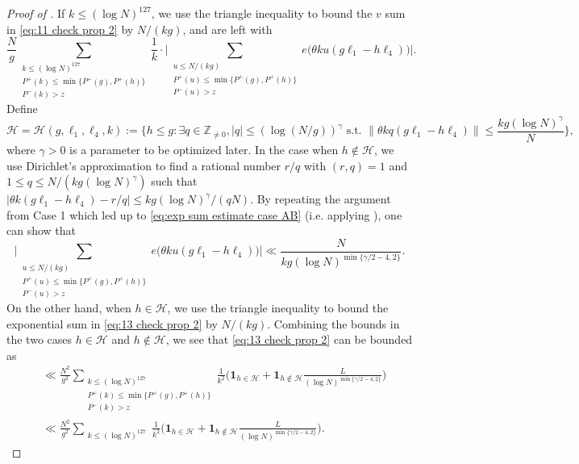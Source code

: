 \documentclass[12pt]{amsart}
\renewcommand{\leq}{\leqslant}
\numberwithin{equation}{section}
\theoremstyle{plain}
\theoremstyle{definition}
\renewcommand{\l}{\ell}
\newcommand{\Z}{\mathbb{Z}}
\newcommand{\CH}{\mathcal{H}}
\begin{document}
\begin{proof}[Proof of ]
		If $k \leq (\log N)^{127}$, we use the triangle inequality to bound the $v$ sum in \eqref{eq:11 check prop 2} by $N/(kg)$, and are left with
		\begin{equation}\label{eq:13 check prop 2}
			\frac{N}{g}\sum_{\substack{k \leq (\log N)^{127} \\ P^+(k) \leq \min\{P^+(g),P^+(h)\} \\ P^-(k) > z}} \frac{1}{k} \cdot \bigg|\sum_{\substack{u \leq N/(kg) \\ P^+(u) \leq \min\{P^+(g),P^+(h)\} \\ P^-(u) > z}}e\big(\theta k u(g \l_1 - h\l_4)\big)\bigg|.
		\end{equation}
		Define $$\CH = \CH(g,\l_1,\l_4,k) := \bigg\{h \leq g : \exists q \in \Z_{\ne 0}, |q| \leq (\log (N/g))^{\gamma} \text{ s.t. } \|\theta k q (g \l_1 - h\l_4)\| \leq \frac{kg(\log N)^{\gamma}}{N}\bigg\},$$
		where $\gamma > 0$ is a parameter to be optimized later. In the case when $h \not \in \CH$, we use Dirichlet's approximation to find a rational number $r/q$ with $(r,q) = 1$ and $1 \leq q \leq N/(kg(\log N)^\gamma)$ such that $|\theta k (g \l_1 - h\l_4)-r/q| \leq kg(\log N)^\gamma/(qN)$. By repeating the argument from Case 1 which led up to \eqref{eq:exp sum estimate case AB} (i.e. applying ), one can show that
		\begin{equation}\label{eq:13.5 check prop 2}
			\bigg|\sum_{\substack{u \leq N/(kg) \\ P^+(u) \leq \min\{P^+(g),P^+(h)\} \\ P^-(u) > z}}e\big(\theta k u(g \l_1 - h\l_4)\big)\bigg| \ll \frac{N}{kg (\log N)^{\min\{\gamma/2-4,2\}}}.
		\end{equation}
		On the other hand, when $h \in \CH$, we use the triangle inequality to bound the exponential sum in \eqref{eq:13 check prop 2} by $N/(kg)$. Combining the bounds in the two cases $h \in \CH$ and $h \not \in \CH$, we see that \eqref{eq:13 check prop 2} can be bounded as
		\begin{align*}
			&\ll \frac{N^2}{g^2} \sum_{\substack{k \leq (\log N)^{127} \\ P^+(k) \leq \min\{P^+(g),P^+(h)\} \\ P^-(k) > z}} \frac{1}{k^2}\bigg(\bm{1}_{h \in \CH} + \bm{1}_{h \not \in \CH} \frac{L}{(\log N)^{\min\{\gamma/2-4,2\}}}\bigg) \\ 
			&\ll \frac{N^2}{g^2}\sum_{\substack{k \leq (\log N)^{127}}} \frac{1}{k^2} \bigg(\bm{1}_{h \in \CH} + \bm{1}_{h \not \in \CH} \frac{L}{(\log N)^{\min\{\gamma/2-4,2\}}}\bigg).

\end{align*}
\end{proof}
\end{document}
